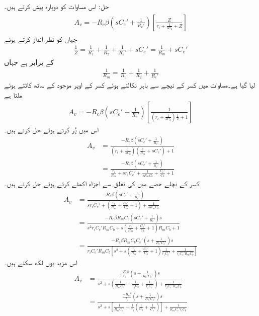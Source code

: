 حل: اس مساوات کو دوبارہ پیش کرتے ہیں۔
\begin{gather}
\begin{aligned} \label{مساوات_تعددی_ردعمل_قابو_مخارج_کپیسٹر_الف}
A_v =-R_c \beta \left(s C_e'+\frac{1}{R_e'} \right) \left[\frac{Z}{r_i+\frac{1}{sC_b}+Z} \right]
\end{aligned}
\end{gather}
جہاں  کو نظر انداز کرتے ہوئے
\begin{align*}
\frac{1}{Z}=\frac{1}{R_1}+\frac{1}{R_2}+\frac{1}{R_e'}+s C_e'=\frac{1}{R_m}+s C_e'
\end{align*}
کے برابر ہے جہاں
\begin{align*}
\frac{1}{R_m}=\frac{1}{R_1}+\frac{1}{R_2}+\frac{1}{R_e'}
\end{align*}
لیا گیا ہے۔مساوات  میں کسر کے نیچے   سے  باہر نکالتے ہوئے کسر کے اوپر موجود  کے ساتھ کاٹتے ہوئے ملتا ہے
\begin{align*}
A_v=-R_c \beta \left(s C_e'+\frac{1}{R_e'} \right) \left[\frac{1}{\left(r_i+\frac{1}{sC_b}\right)\frac{1}{Z}+1} \right]
\end{align*}
اس میں  پُر کرتے ہوئے حل کرتے ہیں۔
\begin{align*}
A_v&=\frac{-R_c \beta \left(s C_e'+\frac{1}{R_e'} \right)}{\left(r_i+\frac{1}{sC_b}\right)\left(\frac{1}{R_m}+sC_e' \right)+1}\\
&=\frac{-R_c \beta \left(s C_e'+\frac{1}{R_e'} \right)}{\frac{r_i}{R_m}+s r_i C_e'+\frac{1}{s R_mC_b}+\frac{C_e'}{C_b}+1}
\end{align*}
کسر کے نچلے حصے میں  کی تعلق سے اجزاء اکھٹے کرتے  ہوئے حل کرتے ہیں۔
\begin{align*}
A_v&=\frac{-R_c \beta \left(s C_e'+\frac{1}{R_e'}\right)}{s r_i C_e'+\left(\frac{r_i}{R_m}+\frac{C_e'}{C_b}+1\right)+\frac{1}{s R_mC_b}}\\
&=\frac{-R_c \beta R_m C_b\left(s C_e'+\frac{1}{R_e'} \right) s}{s^2 r_i C_e' R_m C_b+s \left(\frac{r_i}{R_m}+\frac{C_e'}{C_b}+1\right) R_m C_b+1}\\
&=\frac{-R_c \beta R_m C_b  C_e' \left(s+\frac{1}{R_e'  C_e' }\right) s}{ r_i C_e' R_m C_b  \left[s^2+s \left(\frac{r_i}{R_m}+\frac{C_e'}{C_b}+1\right) \frac{1}{r_i C_e'}+\frac{1}{ r_i C_e' R_m C_b} \right]}
\end{align*}
اس مزید یوں لکھ سکتے ہیں۔
\begin{align*}
A_v&=\frac{\frac{-R_c \beta}{r_i}\left(s+\frac{1}{R_e'  C_e' }\right) s}{s^2+s \left(\frac{1}{R_m C_e'}+\frac{1}{r_i C_b}+\frac{1}{r_i C_e'}\right) +\frac{1}{ r_i C_e' R_m C_b}}\\
&=\frac{\frac{-R_c \beta}{r_i}\left(s+\frac{1}{R_e'  C_e' }\right) s}{s^2+s \left[\frac{1}{R_m C_e'}+\frac{1}{r_i} \left(\frac{1}{C_b}+\frac{1}{ C_e'} \right)\right] +\frac{1}{R_m C_e' r_i C_b}}
\end{align*}
